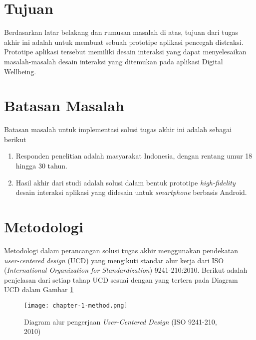 \section{Tujuan}

Berdasarkan latar belakang dan rumusan masalah di atas, tujuan dari tugas akhir ini adalah untuk membuat sebuah prototipe aplikasi pencegah distraksi. Prototipe aplikasi tersebut memiliki desain interaksi yang dapat menyelesaikan masalah-masalah desain interaksi yang ditemukan pada aplikasi Digital Wellbeing.


\section{Batasan Masalah}

Batasan masalah untuk implementasi solusi tugas akhir ini adalah sebagai berikut
\begin{enumerate}
  \item Responden penelitian adalah masyarakat Indonesia, dengan rentang umur 18 hingga 30 tahun.
  \item Hasil akhir dari studi adalah solusi dalam bentuk prototipe \textit{high-fidelity} desain interaksi aplikasi yang didesain untuk \textit{smartphone} berbasis Android.
\end{enumerate}

\section{Metodologi}
\label{sec:metodologi}

Metodologi dalam perancangan solusi tugas akhir menggunakan pendekatan \textit{user-centered design} (UCD) yang mengikuti standar alur kerja dari ISO (\textit{International Organization for Standardization}) 9241-210:2010. Berikut adalah penjelasan dari setiap tahap UCD sesuai dengan yang tertera pada Diagram UCD dalam Gambar \ref{fig:diagram_iso1}


\begin{figure}[h]
  \centering
  \texttt{[image: chapter-1-method.png]}
  \caption{Diagram alur pengerjaan \textit{User-Centered Design} (ISO 9241-210, 2010)}
  \label{fig:diagram_iso1}
\end{figure}

